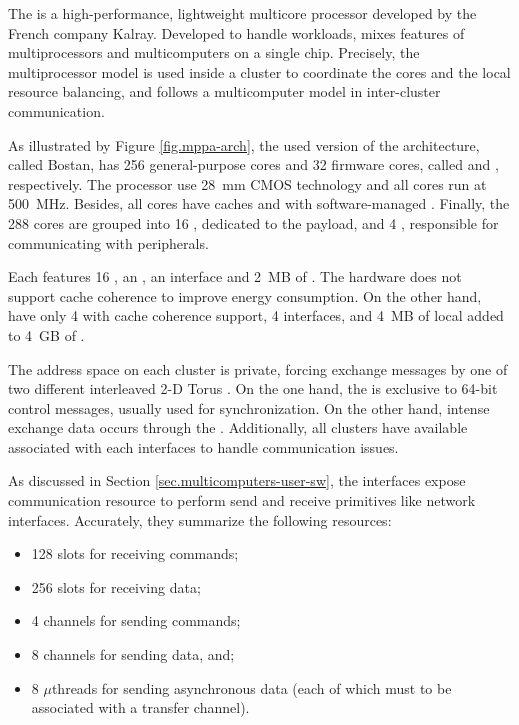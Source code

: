 	The \mppa is a high-performance, lightweight multicore processor
	developed by the French company Kalray.
	Developed to handle \mimd workloads, \mppa mixes features of
	multiprocessors and multicomputers on a single chip.
	Precisely, the multiprocessor model is used inside a cluster
	to coordinate the cores and the local resource balancing, and
	follows a multicomputer model in inter-cluster communication.

	As illustrated by Figure \ref{fig.mppa-arch}, the used version of
	the architecture, called Bostan, has 256 general-purpose cores and
	32 firmware cores, called \pes and \rmans, respectively.
	The processor use 28~mm CMOS technology and all cores run at 500~MHz.
	Besides, all cores have caches and \mmus with software-managed \tlbs.
	Finally, the 288 cores are grouped into 16 \cclusters, dedicated to
	the payload, and 4 \ioclusters, responsible for communicating with peripherals.

	Each \ccluster features 16 \pes, an \rman, an \noc interface and 2~MB of \sram.
	The hardware does not support cache coherence to improve energy consumption.
	On the other hand, \ioclusters have only 4 \rmans with cache coherence support,
	4 \noc interfaces, and 4~MB of local \sram added to 4~GB of \dram.

	The address space on each cluster is private, forcing exchange messages
	by one of two different interleaved 2-D Torus \nocs.
	On the one hand, the \cnoc is exclusive to 64-bit control messages,
	usually used for synchronization.
	On the other hand, intense exchange data occurs through the \dnoc.
	Additionally, all clusters have available \dmas associated with each
	\noc interfaces to handle communication issues.

	As discussed in Section \ref{sec.multicomputers-user-sw}, the \noc interfaces
	expose communication resource to perform send and receive primitives
	like network interfaces.
	Accurately, they summarize the following resources:

	\begin{itemize}
		\item 128 slots for receiving commands;
		\item 256 slots for receiving data;
		\item 4 channels for sending commands;
		\item 8 channels for sending data, and;
		\item 8 $\mu$threads for sending asynchronous data (each of which must to be associated 
		with a transfer channel).
	\end{itemize}

